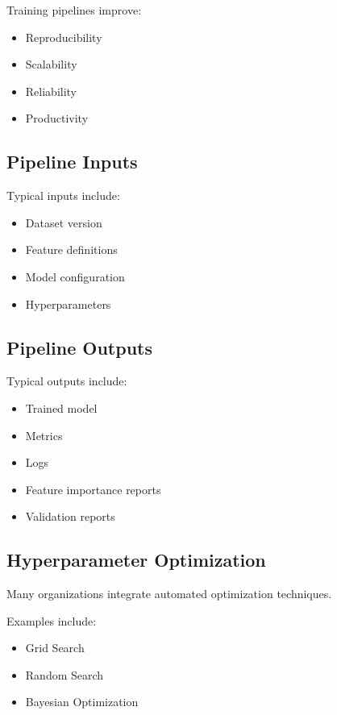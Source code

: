 Training pipelines improve:

\begin{itemize}
    \item Reproducibility
    \item Scalability
    \item Reliability
    \item Productivity
\end{itemize}

\subsection{Pipeline Inputs}

Typical inputs include:

\begin{itemize}
    \item Dataset version
    \item Feature definitions
    \item Model configuration
    \item Hyperparameters
\end{itemize}

\subsection{Pipeline Outputs}

Typical outputs include:

\begin{itemize}
    \item Trained model
    \item Metrics
    \item Logs
    \item Feature importance reports
    \item Validation reports
\end{itemize}

\subsection{Hyperparameter Optimization}

Many organizations integrate automated optimization techniques.

Examples include:

\begin{itemize}
    \item Grid Search
    \item Random Search
    \item Bayesian Optimization
\end{itemize}

